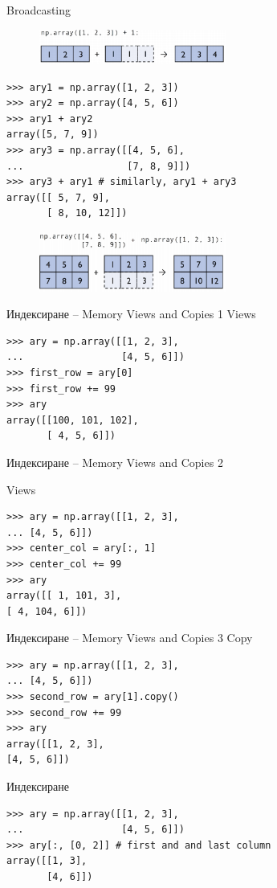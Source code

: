\documentclass{beamer}
\begin{document}
\begin{frame}[fragile]{Broadcasting}
\begin{figure}
    \centering
    \includegraphics[width=0.55\textwidth]{np5.png}
\end{figure}
\begin{verbatim}
>>> ary1 = np.array([1, 2, 3])
>>> ary2 = np.array([4, 5, 6])
>>> ary1 + ary2
array([5, 7, 9])
>>> ary3 = np.array([[4, 5, 6],
...                  [7, 8, 9]])
>>> ary3 + ary1 # similarly, ary1 + ary3
array([[ 5, 7, 9],
       [ 8, 10, 12]])
\end{verbatim}
\begin{figure}
    \centering
    \includegraphics[width=0.55\textwidth]{np6.png}
\end{figure}
\end{frame}

\begin{frame}[fragile]{Индексиране – Memory Views and Copies 1}
Views
\begin{verbatim}
>>> ary = np.array([[1, 2, 3],
...                 [4, 5, 6]])
>>> first_row = ary[0]
>>> first_row += 99
>>> ary
array([[100, 101, 102],
       [ 4, 5, 6]])
\end{verbatim}
\end{frame}

\begin{frame}[fragile]{Индексиране – Memory Views and Copies 2}

Views
\begin{verbatim}
>>> ary = np.array([[1, 2, 3],
... [4, 5, 6]])
>>> center_col = ary[:, 1]
>>> center_col += 99
>>> ary
array([[ 1, 101, 3],
[ 4, 104, 6]])
\end{verbatim}
\end{frame}

\begin{frame}[fragile]{Индексиране – Memory Views and Copies 3}
Copy
\begin{verbatim}
>>> ary = np.array([[1, 2, 3],
... [4, 5, 6]])
>>> second_row = ary[1].copy()
>>> second_row += 99
>>> ary
array([[1, 2, 3],
[4, 5, 6]])
\end{verbatim}
Индексиране
\begin{verbatim}
>>> ary = np.array([[1, 2, 3],
...                 [4, 5, 6]])
>>> ary[:, [0, 2]] # first and and last column
array([[1, 3],
       [4, 6]])
\end{verbatim}
\end{frame}
\end{document}
